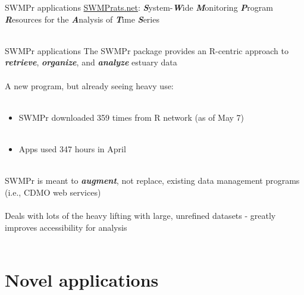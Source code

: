 \documentclass[serif]{beamer}\usepackage[]{graphicx}\usepackage[]{color}
\newcommand{\Bigtxt}[1]{\textbf{\textit{#1}}}
\begin{document}
\begin{frame}[t]{SWMPr applications}
\href{https://swmprats.net}{SWMPrats.net}: \Bigtxt{S}ystem-\Bigtxt{W}ide \Bigtxt{M}onitoring \Bigtxt{P}rogram \Bigtxt{R}esources for the \Bigtxt{A}nalysis of \Bigtxt{T}ime \Bigtxt{S}eries \\~\\
\centerline{}
\end{frame}

\begin{frame}{SWMPr applications}
The SWMPr package provides an R-centric approach to \Bigtxt{retrieve}, \Bigtxt{organize}, and \Bigtxt{analyze} estuary data \\~\\
A new program, but already seeing heavy use:\\~\\
\begin{itemize}
\item SWMPr downloaded 359 times from R network (as of May 7) \\~\\
\item Apps used 347 hours in April \\~\\
\end{itemize}
SWMPr is meant to \Bigtxt{augment}, not replace, existing data management programs (i.e., CDMO web services) \\~\\
Deals with lots of the heavy lifting with large, unrefined datasets - greatly improves accessibility for analysis \\~\\
\end{frame}

\section{Novel applications}
\end{document}

